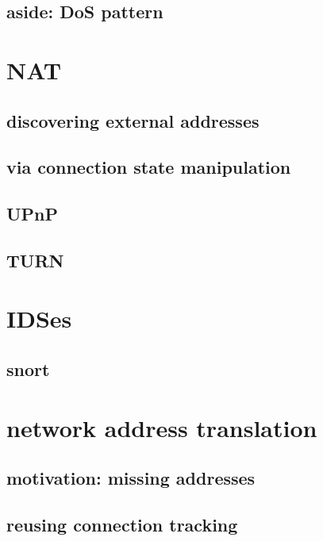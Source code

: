 \subsection{aside: DoS pattern}


\section{NAT}


\subsection{discovering external addresses}

\subsection{via connection state manipulation}

\subsection{UPnP}

\subsection{TURN}

\section{IDSes}

\subsection{snort}

\section{network address translation}

\subsection{motivation: missing addresses}

\subsection{reusing connection tracking}
